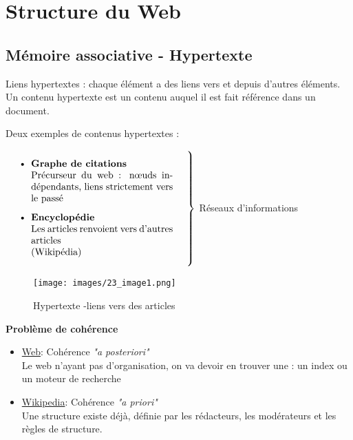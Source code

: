 \chapter{Structure du Web} %


\section{Mémoire associative - Hypertexte}

Liens hypertextes : chaque élément a des liens vers et depuis d'autres éléments. Un contenu hypertexte est un contenu auquel il est fait référence dans un document.

\vspace{0.5cm}
Deux exemples de contenus hypertextes :

$
\left. 
\parbox{0.5\linewidth}{
\begin{itemize}
\item \textbf{Graphe de citations} \\
		Précurseur du web : nœuds indépendants, liens strictement vers le passé
\item \textbf{Encyclopédie} \\
		Les articles renvoient vers d'autres articles \\ (Wikipédia)
\end{itemize}
}%
\hspace{0.5cm} \right\}
$ Réseaux d'informations




\begin{figure}[!h]
\centering
\texttt{[image: images/23\_image1.png]}
\caption{Hypertexte -liens vers des articles}
\label{hypertexte}
\end{figure}

\textbf{Problème de cohérence}

\begin{itemize}
\item \underline{Web}: Cohérence \textit{"a posteriori"} 
						\vspace{0.1cm}
                       \\ Le web n'ayant pas d'organisation, on va devoir en trouver une : un index ou un moteur de recherche
      
\item \underline{Wikipedia}: Cohérence \textit{"a priori"}
							\vspace{0.1cm}
                             \\ Une structure existe déjà, définie par les rédacteurs, les modérateurs et les règles de structure.
\end{itemize}

